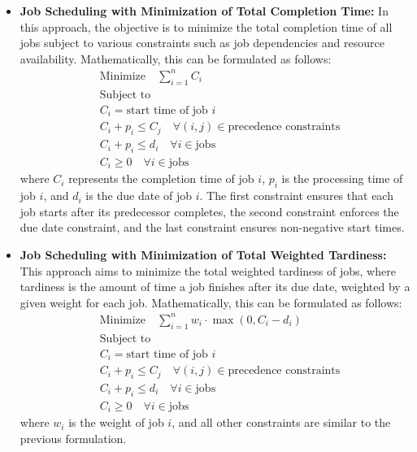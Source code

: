 \documentclass[12pt]{book} %
\begin{document}
\begin{itemize}
    \item \textbf{Job Scheduling with Minimization of Total Completion Time:} In this approach, the objective is to minimize the total completion time of all jobs subject to various constraints such as job dependencies and resource availability. Mathematically, this can be formulated as follows:
    \FloatBarrier
    \begin{align*}
        & \text{Minimize} \quad \sum_{i=1}^{n} C_i \\
        & \text{Subject to} \\
        & C_i = \text{start time of job } i \\
        & C_i + p_i \leq C_j \quad \forall (i, j) \in \text{precedence constraints} \\
        & C_i + p_i \leq d_i \quad \forall i \in \text{jobs} \\
        & C_i \geq 0 \quad \forall i \in \text{jobs}
    \end{align*}
    \FloatBarrier
    where \(C_i\) represents the completion time of job \(i\), \(p_i\) is the processing time of job \(i\), and \(d_i\) is the due date of job \(i\). The first constraint ensures that each job starts after its predecessor completes, the second constraint enforces the due date constraint, and the last constraint ensures non-negative start times.
    
    \item \textbf{Job Scheduling with Minimization of Total Weighted Tardiness:} This approach aims to minimize the total weighted tardiness of jobs, where tardiness is the amount of time a job finishes after its due date, weighted by a given weight for each job. Mathematically, this can be formulated as follows:
    \FloatBarrier
    \begin{align*}
        & \text{Minimize} \quad \sum_{i=1}^{n} w_i \cdot \max(0, C_i - d_i) \\
        & \text{Subject to} \\
        & C_i = \text{start time of job } i \\
        & C_i + p_i \leq C_j \quad \forall (i, j) \in \text{precedence constraints} \\
        & C_i + p_i \leq d_i \quad \forall i \in \text{jobs} \\
        & C_i \geq 0 \quad \forall i \in \text{jobs}
    \end{align*}
    \FloatBarrier
    where \(w_i\) is the weight of job \(i\), and all other constraints are similar to the previous formulation.
\end{itemize}
\end{document}
